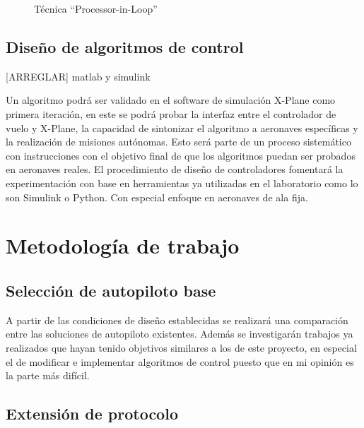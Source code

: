 \begin{figure}[h]
    \centering
    
    \caption{Técnica ``Processor-in-Loop''}
    \label{fig:pil}
\end{figure}

\subsection{Diseño de algoritmos de control}

[ARREGLAR]
matlab y simulink

Un algoritmo podrá ser validado en el software de simulación X-Plane como primera iteración, en este se podrá probar la interfaz entre el controlador de vuelo y X-Plane, la capacidad de sintonizar el algoritmo a aeronaves específicas y la realización de misiones autónomas. Esto será parte de un proceso sistemático con instrucciones con el objetivo final de que los algoritmos puedan ser probados en aeronaves reales. El procedimiento de diseño de controladores fomentará la experimentación con base en herramientas ya utilizadas en el laboratorio como lo son Simulink o Python. Con especial enfoque en aeronaves de ala fija.

\section{Metodología de trabajo}

\subsection{Selección de autopiloto base}

A partir de las condiciones de diseño establecidas se realizará una comparación entre las soluciones de autopiloto existentes. Además se investigarán trabajos ya realizados que hayan tenido objetivos similares a los de este proyecto, en especial el de modificar e implementar algoritmos de control puesto que en mi opinión es la parte más difícil.

\subsection{Extensión de protocolo}

